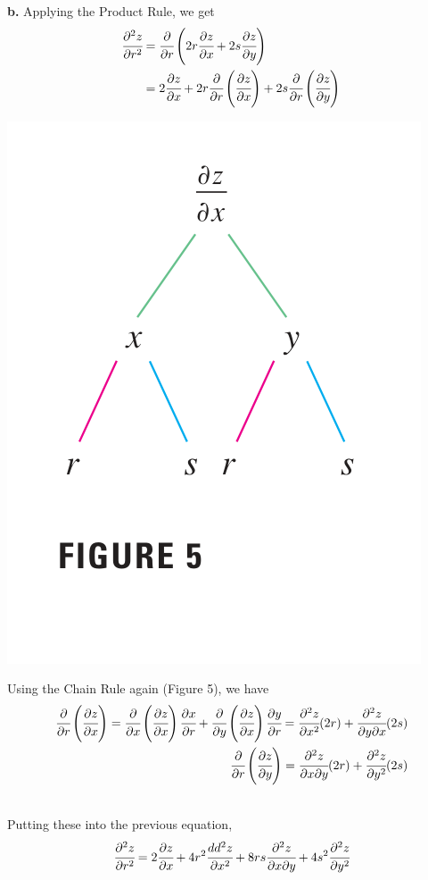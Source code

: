 \documentclass{article}
\begin{document}
\textbf{b.} Applying the Product Rule, we get 
\begin{align*}
  \cfrac{\partial ^2 z }{\partial r^2 } & = \cfrac{\partial }{\partial r } \left( 2r \cfrac{\partial z }{\partial x } + 2s \cfrac{\partial z }{\partial y } \right) \\
  & = 2 \cfrac{\partial z }{\partial x } + 2r \cfrac{\partial }{\partial r } \left( \cfrac{\partial z }{\partial x } \right) + 2s \cfrac{\partial }{\partial r } \left( \cfrac{\partial z }{\partial y } \right)
\end{align*}

\begin{minipage}[]{0.26\linewidth}
  \includegraphics[width = 4 cm]{./images/chainrulefig5.png}
  
\end{minipage}
\begin{minipage}[]{0.69\linewidth}

Using the Chain Rule again (Figure 5), we have 
\begin{align*}
  \cfrac{\partial  }{\partial r  } \left( \cfrac{\partial z }{ \partial x } \right) = \cfrac{\partial }{ \partial x } \left( \cfrac{\partial z }{ \partial x } \right) \cfrac{\partial x }{ \partial r } + \cfrac{\partial }{ \partial y } \left( \cfrac{\partial z }{ \partial x } \right) \cfrac{\partial y }{\partial r }= \cfrac{\partial ^2 z }{\partial x^2 } (2r) + \cfrac{\partial ^2 z }{\partial y \partial x } (2s) \\
  \cfrac{\partial }{ \partial r } \left( \cfrac{\partial z }{ \partial y } \right) = \cfrac{\partial ^2 z }{\partial x \partial y } (2r) + \cfrac{\partial ^2 z }{ \partial y^2 }(2s) 
\end{align*} 
\end{minipage}\\
Putting these into the previous equation, 
\[\cfrac{\partial ^2 z }{\partial r^2 } = 2 \cfrac{\partial z }{\partial x } + 4 r^2 \cfrac{dd^2 z }{\partial x^2 } + 8rs \cfrac{\partial ^2 z }{\partial x \partial y } + 4s^2 \cfrac{\partial ^2 z }{\partial y^2 }\]
\end{document}
